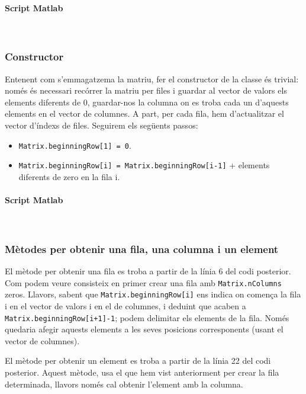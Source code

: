 \documentclass[11pt,a4paper,twoside]{report}
\begin{document}
\paragraph*{Script Matlab}\mbox{}\\



\subsubsection{Constructor}
\label{sec:Constructor}
Entenent com s'emmagatzema la matriu, fer el constructor de la classe és trivial: només és necessari recórrer la matriu per files i guardar al vector de valors els elements diferents de 0, guardar-nos la columna on es troba cada un d'aquests elements en el vector de columnes. A part, per cada fila, hem d'actualitzar el vector d'índexs de files. Seguirem els següents passos:
\begin{itemize}
\item \texttt{Matrix.beginningRow[1] = 0}.
\item \texttt{Matrix.beginningRow[i] = Matrix.beginningRow[i-1]} + elements diferents de zero en la fila i.
\end{itemize}

\paragraph*{Script Matlab} \mbox{} \\



\subsubsection{Mètodes per obtenir una fila, una columna i un element}

El mètode per obtenir una fila es troba a partir de la línia 6 del codi posterior. Com podem veure consisteix en primer crear una fila amb \texttt{Matrix.nColumns} zeros.
Llavors, sabent que \texttt{Matrix.beginningRow[i]} ens indica on comença la fila i en el vector de valors i en el de columnes, i deduint que acaben a \texttt{Matrix.beginningRow[i+1]-1}; podem delimitar els elements de la fila. Només quedaria afegir aquests elements a les seves posicions corresponents (usant el vector de columnes).

El mètode per obtenir un element es troba a partir de la línia 22 del codi posterior. Aquest mètode, usa el que hem vist anteriorment per crear la fila determinada, llavors només cal obtenir l'element amb la columna.
\end{document}

